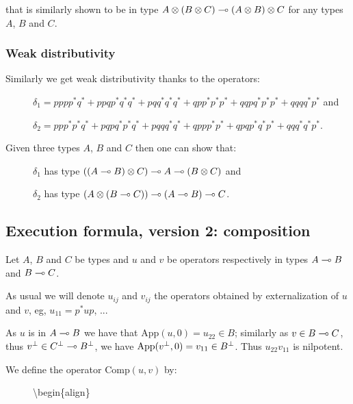 that is similarly shown to be in type
\(A\otimes(B\otimes C)\multimap(A\otimes B)\otimes C\) for any types \(A\), \(B\)
and \(C\).

\subsubsection{Weak distributivity}\label{weak-distributivity}

Similarly we get weak distributivity thanks to the operators:

\begin{description}
\item[]
\(\delta_1 = pppp^*q^* + ppqp^*q^*q^* + pqq^*q^*q^* + qpp^*p^*p^* + qqp q^*p^*p^* + qqq q^*p^*\)
and

\(\delta_2 = ppp^*p^*q^* + pqpq^*p^*q^* + pqqq^*q^* + qppp^*p^* + qpqp^*q^*p^* + qqq^*q^*p^*\).
\end{description}

Given three types \(A\), \(B\) and \(C\) then one can show that:

\begin{description}
\item[]
\(\delta_1\) has type \(((A\multimap B)\otimes C)\multimap A\multimap (B\otimes C)\) and

\(\delta_2\) has type \((A\otimes(B\multimap C))\multimap (A\multimap B)\multimap C\).
\end{description}

\subsection{Execution formula, version 2: composition}\label{execution-formula-version-2-composition}

Let \(A\), \(B\) and \(C\) be types and \(u\) and \(v\) be operators
respectively in types \(A\multimap B\) and \(B\multimap C\).

As usual we will denote \(u_{ij}\) and \(v_{ij}\) the operators obtained
by externalization of \(u\) and \(v\), eg, \(u_{11} = p^*up\), ...

As \(u\) is in \(A\multimap B\) we have that
\(\mathrm{App}(u, 0)=u_{22}\in B\); similarly as \(v\in B\multimap C\), thus
\(v^\bot\in C^\bot\multimap B^\bot\), we have
\(\mathrm{App}(v^\bot, 0) = v_{11}\in B^\bot\). Thus \(u_{22}v_{11}\) is
nilpotent.

We define the operator \(\mathrm{Comp}(u, v)\) by:

\begin{description}
\item[]
\textbackslash{}begin\{align\}
\end{description}


